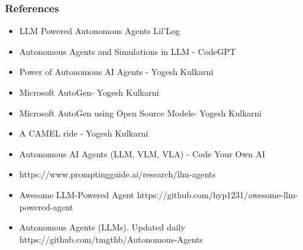 \begin{frame}[fragile]\frametitle{References}
\begin{itemize}
\item LLM Powered Autonomous Agents Lil'Log
\item Autonomous Agents and Simulations in LLM - CodeGPT
\item Power of Autonomous AI Agents - Yogesh Kulkarni
\item Microsoft AutoGen- Yogesh Kulkarni
\item Microsoft AutoGen using Open Source Models- Yogesh Kulkarni
\item A CAMEL ride - Yogesh Kulkarni
\item Autonomous AI Agents (LLM, VLM, VLA) - Code Your Own AI
\item https://www.promptingguide.ai/research/llm-agents
\item Awesome LLM-Powered Agent https://github.com/hyp1231/awesome-llm-powered-agent
\item Autonomous Agents (LLMs). Updated daily https://github.com/tmgthb/Autonomous-Agents
\end{itemize}
\end{frame}